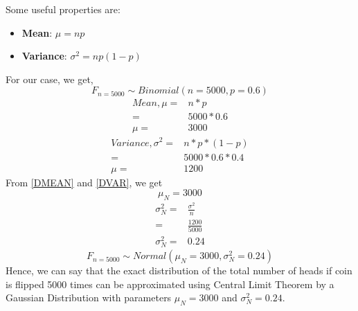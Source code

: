 \documentclass[12pt,twoside,a4paper]{article}
\begin{document}
Some useful properties are:
\begin{itemize}
    \item \textbf{Mean}: $\mu = np$
    \item \textbf{Variance}: $\sigma^2 = np(1-p)$
\end{itemize}
For our case, we get,
$$F_{n = 5000} \sim Binomial(n = 5000, p = 0.6)$$
\begin{align*}
    Mean, \mu =& n*p \\
        =& 5000*0.6 \\
        \mu=& 3000
\end{align*}
\begin{align*}
    Variance, \sigma^2 =& n*p*(1-p) \\
        =& 5000*0.6*0.4 \\
        \mu=& 1200
\end{align*}
From \eqref{DMEAN} and \eqref{DVAR}, we get
$$\mu_N = 3000$$
\begin{align*}
    \sigma_N^2 =& \frac{\sigma^2}{n} \\
               =& \frac{1200}{5000}  \\
    \sigma_N^2 =& 0.24
\end{align*}
$$F_{n=5000} \sim Normal(\mu_N = 3000, \sigma^2_N = 0.24)$$
Hence, we can say that the exact distribution of the total number of heads if coin is flipped 5000 times can be approximated using Central Limit Theorem by a Gaussian Distribution with parameters $\mu_N = 3000$ and $\sigma^2_N = 0.24$.

{\small

}
\end{document}
